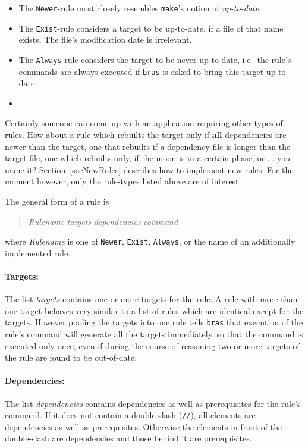 \documentclass[12pt]{article}
\newcommand{\bras}{\texttt{bras}}
\newcommand{\make}{\texttt{make}}
\begin{document}
\begin{itemize}
\item 
The \texttt{Newer}-rule most closely resembles \make's notion of
\textit{up-to-date}.
\item 
The \texttt{Exist}-rule considers a target to be up-to-date,
if a file of that name exists. The file's modification date is irrelevant.
\item 
The \texttt{Always}-rule considers the target to be never
up-to-date, i.e.\ the rule's commands are always executed if
\bras{} is asked to bring this target up-to-date.
\item
\end{itemize}

Certainly someone can come up with an application requiring other
types of rules. How about a rule which rebuilts
the target only if \textbf{all} dependencies are newer than the
target, one that rebuilts if a dependency-file is longer than the
target-file, one which rebuilts only, if the moon is in a certain
phase, or $\ldots$ you name it?  Section~\ref{secNewRules} describes
how to implement new rules. For the moment however, only the
rule-types listed above are of interest.

The general form of a rule is
\begin{quote}
\textit{Rulename} \textit{targets} \textit{dependencies} \textit{command}
\end{quote}
where \textit{Rulename} is one of \texttt{Newer}, \texttt{Exist},
\texttt{Always}, or the name of an additionally
implemented rule. 

\paragraph{Targets:}
The list \textit{targets} contains one or more targets for the rule. A
rule with more than one target behaves very similar to a list of rules
which are identical except for the targets. However pooling the
targets into one rule tells \bras{} that execution of the rule's
command will generate all the targets immediately, so that the command
is executed only once, even if during the course of reasoning two or
more targets of the rule are found to be out-of-date.

\paragraph{Dependencies:}
The list \textit{dependencies} contains dependencies as well as
prerequisites for the rule's command. If it does not contain a
double-slash (\texttt{//}), all elements are dependencies as
well as prerequisites. Otherwise the elements in front of the
double-slash are dependencies and those behind it are prerequisites.
\end{document}
